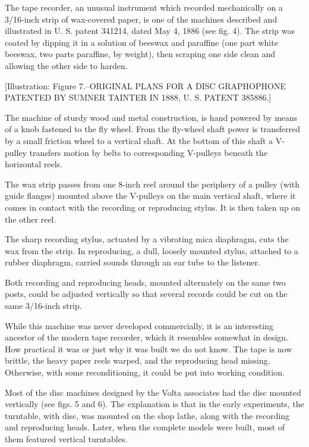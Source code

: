 \documentclass[12pt,oneside]{scrbook}
\begin{document}
  The tape recorder, an unusual instrument which recorded mechanically on
  a 3/16-inch strip of wax-covered paper, is one of the machines described
  and illustrated in U. S. patent 341214, dated May 4, 1886 (see fig. 4).
  The strip was coated by dipping it in a solution of beeswax and
  paraffine (one part white beeswax, two parts paraffine, by weight), then
  scraping one side clean and allowing the other side to harden.
  
  {[}Illustration: Figure 7.--ORIGINAL PLANS FOR A DISC GRAPHOPHONE
  PATENTED BY SUMNER TAINTER IN 1888, U. S. PATENT 385886.{]}
  
  The machine of sturdy wood and metal construction, is hand powered by
  means of a knob fastened to the fly wheel. From the fly-wheel shaft
  power is transferred by a small friction wheel to a vertical shaft. At
  the bottom of this shaft a V-pulley transfers motion by belts to
  corresponding V-pulleys beneath the horizontal reels.
  
  The wax strip passes from one 8-inch reel around the periphery of a
  pulley (with guide flanges) mounted above the V-pulleys on the main
  vertical shaft, where it comes in contact with the recording or
  reproducing stylus. It is then taken up on the other reel.
  
  The sharp recording stylus, actuated by a vibrating mica diaphragm, cuts
  the wax from the strip. In reproducing, a dull, loosely mounted stylus,
  attached to a rubber diaphragm, carried sounds through an ear tube to
  the listener.
  
  Both recording and reproducing heads, mounted alternately on the same
  two posts, could be adjusted vertically so that several records could be
  cut on the same 3/16-inch strip.
  
  While this machine was never developed commercially, it is an
  interesting ancestor of the modern tape recorder, which it resembles
  somewhat in design. How practical it was or just why it was built we do
  not know. The tape is now brittle, the heavy paper reels warped, and the
  reproducing head missing. Otherwise, with some reconditioning, it could
  be put into working condition.
  
  Most of the disc machines designed by the Volta associates had the disc
  mounted vertically (see figs. 5 and 6). The explanation is that in the
  early experiments, the turntable, with disc, was mounted on the shop
  lathe, along with the recording and reproducing heads. Later, when the
  complete models were built, most of them featured vertical turntables.
  
\end{document}
